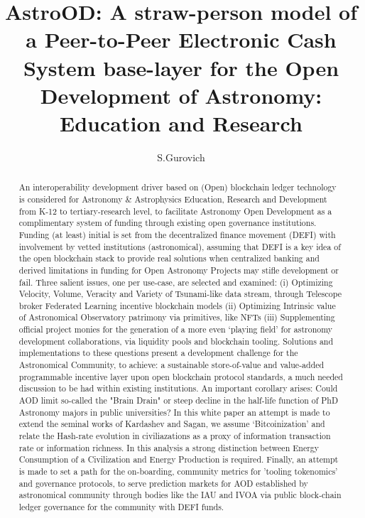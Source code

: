 \documentclass[final,5p,times,twocolumn,authoryear]{elsarticle}
\begin{document}
\begin{frontmatter}

\title{ AstroOD: A straw-person model of a Peer-to-Peer Electronic Cash System base-layer for the Open Development of Astronomy: Education and Research}
 
    \author[iate,wsu]{S.Gurovich}
  
\address[iate]{
   Instituto De Astronom\'ia Te\'orica y Experimental -
   Observatorio Astron\'omico C\'ordoba (IATE--OAC--UNC--CONICET),
   Laprida 854, X5000BGR, C\'ordoba, Argentina}
\address[wsu]{
   Western Sydney University, Kingswood campus, NSW, Australia
}

\begin{abstract}

An interoperability  development driver based on (Open) blockchain ledger technology is considered for Astronomy \& Astrophysics Education, Research and Development from K-12 to tertiary-research level, to facilitate Astronomy Open Development as a complimentary system of funding through existing open governance institutions. Funding (at least) initial is set from the decentralized finance movement (DEFI) with involvement by vetted institutions (astronomical), assuming that DEFI is a key idea of the open blockchain stack to provide real solutions when centralized banking and derived limitations in funding for Open Astronomy Projects may stifle development or fail. Three salient issues, one per use-case, are selected and examined: (i) Optimizing Velocity, Volume, Veracity and Variety of Tsunami-like data stream, through Telescope broker Federated Learning incentive blockchain models (ii) Optimizing Intrinsic value of Astronomical Observatory patrimony via primitives, like NFTs (iii) Supplementing official project monies for the generation of a more even `playing field' for astronomy development collaborations, via liquidity pools and blockchain tooling. Solutions and implementations to these questions present a development challenge for the Astronomical Community, to achieve: a sustainable store-of-value and value-added programmable incentive layer upon open blockchain protocol standards, a much needed discussion to be had within existing institutions. An important corollary arises: Could AOD limit so-called the "Brain Drain" or steep decline in the half-life function of PhD Astronomy majors in public universities? In this white paper an attempt is made to extend the seminal works of Kardashev and Sagan, we assume `Bitcoinization' and relate the Hash-rate evolution in civiliazations as a proxy of information transaction rate or information richness. In this analysis a strong distinction between Energy Consumption of a Civilization and Energy Production is required. Finally, an attempt is made to set a path for the on-boarding, community metrics for 'tooling tokenomics' and governance protocols, to serve prediction markets for AOD established by astronomical community through bodies like the IAU and IVOA via public  block-chain ledger governance for the community with DEFI funds. 


\end{abstract}
\end{frontmatter}
\end{document}

